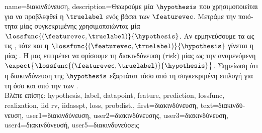 {name={\foreignlanguage{greek}{διακινδύνευση}},
	description={\foreignlanguage{greek}{Θεωρούμε μία} 
		 $\hypothesis$ \foreignlanguage{greek}{που χρησιμοποιείται για να προβλεφθεί η}  
		$\truelabel$ \foreignlanguage{greek}{ενός}  \foreignlanguage{greek}{βάσει των}  
		$\featurevec$. \foreignlanguage{greek}{Μετράμε την ποιότητα μίας συγκεκριμένης}  
		\foreignlanguage{greek}{χρησιμοποιώντας μία}  $\lossfunc{(\featurevec,\truelabel)}{\hypothesis}$. 
		\foreignlanguage{greek}{Αν ερμηνεύσουμε τα}  \foreignlanguage{greek}{ως τις}  
		 , \foreignlanguage{greek}{τότε και η $\lossfunc{(\featurevec,\truelabel)}{\hypothesis}$ γίνεται η} 
		 \foreignlanguage{greek}{μίας} . \foreignlanguage{greek}{Η}  
		\foreignlanguage{greek}{μας επιτρέπει να ορίσουμε τη διακινδύνευση} (risk) \foreignlanguage{greek}{μίας}  
		\foreignlanguage{greek}{ως την αναμενόμενη}  $\expect \big\{\lossfunc{(\featurevec,\truelabel)}{\hypothesis} \big\}$. 
		\foreignlanguage{greek}{Σημείωση ότι η διακινδύνευση της $\hypothesis$ εξαρτάται τόσο από τη συγκεκριμένη επιλογή 
		για τη}  \foreignlanguage{greek}{όσο και από την}  
		\foreignlanguage{greek}{των} .
		\\
		\foreignlanguage{greek}{Βλέπε επίσης:} \gls{hypothesis}, \gls{label}, \gls{datapoint}, \gls{feature}, \gls{prediction}, \gls{lossfunc}, 
		\gls{realization}, \gls{iid} \gls{rv}, \gls{iidasspt}, \gls{loss}, \gls{probdist}.},
	first={\foreignlanguage{greek}{διακινδύνευση}},
	text={\foreignlanguage{greek}{διακινδύνευση}},
	user1={\foreignlanguage{greek}{διακινδύνευση}}, %
    	user2={\foreignlanguage{greek}{διακινδύνευσης}}, %
	user3={\foreignlanguage{greek}{διακινδύνευση}}, %
	user4={\foreignlanguage{greek}{διακινδύνευσή}}, %
	user5={\foreignlanguage{greek}{διακινδυνεύσεις}} %
}

